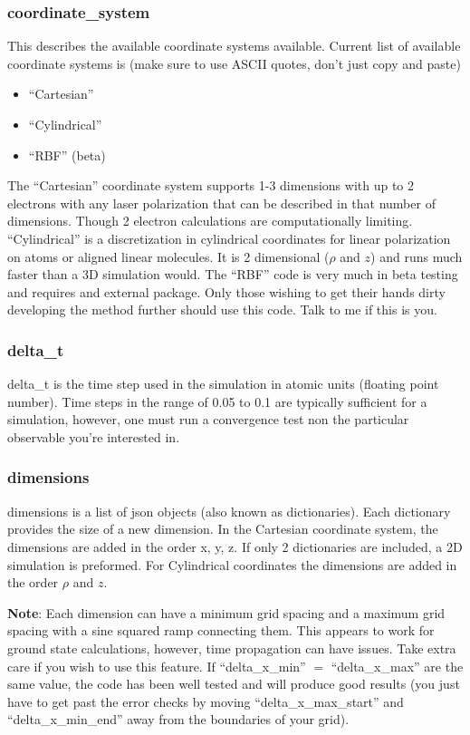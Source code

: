 \documentclass{article}
\begin{document}
\subsubsection{coordinate\_system}
This describes the available coordinate systems available. Current list of available coordinate systems is (make sure to use ASCII quotes, don't just copy and paste)
\begin{itemize}
  \item ``Cartesian''
  \item ``Cylindrical''
  \item ``RBF'' (beta)
\end{itemize}
The ``Cartesian'' coordinate system supports 1-3 dimensions with up to 2 electrons with any laser polarization that can be described in that number of dimensions. Though 2 electron calculations are computationally limiting. ``Cylindrical'' is a discretization in cylindrical coordinates for linear polarization on atoms or aligned linear molecules. It is 2 dimensional ($\rho$ and $z$) and runs much faster than a 3D simulation would. The ``RBF'' code is very much in beta testing and requires and external package. Only those wishing to get their hands dirty developing the method further should use this code. Talk to me if this is you.

\subsubsection{delta\_t}
delta\_t is the time step used in the simulation in atomic units (floating point number). Time steps in the range of 0.05 to 0.1 are typically sufficient for a simulation, however, one must run a convergence test non the particular observable you're interested in.

\subsubsection{dimensions}
\label{ssub:dimensions}
dimensions is a list of json objects (also known as dictionaries). Each dictionary provides the size of a new dimension. In the Cartesian coordinate system, the dimensions are added in the order x, y, z. If only 2 dictionaries are included, a 2D simulation is preformed. For Cylindrical coordinates the dimensions are added in the order $\rho$ and $z$.

\textbf{Note}: Each dimension can have a minimum grid spacing and a maximum grid spacing with a sine squared ramp connecting them. This appears to work for ground state calculations, however, time propagation can have issues. Take extra care if you wish to use this feature. If ``delta\_x\_min'' $=$ ``delta\_x\_max'' are the same value, the code has been well tested and will produce good results (you just have to get past the error checks by moving ``delta\_x\_max\_start'' and ``delta\_x\_min\_end'' away from the boundaries of your grid).
\end{document}

